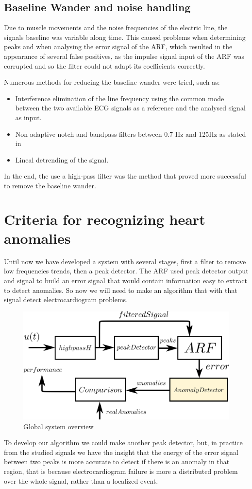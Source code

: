 \documentclass[conference]{IEEEtran}
\begin{document}
\subsection{Baseline Wander and noise handling}

Due to muscle movements and the noise frequencies of the electric line, the signals baseline was variable along time. This caused problems when determining peaks and when analysing the error signal of the ARF, which resulted in the appearance of several false positives, as the impulse signal input of the ARF was corrupted and so the filter could not adapt its coefficients correctly. \par
Numerous methods for reducing the baseline wander were tried, such as:
\begin{itemize}
\item Interference elimination of the line frequency using the common mode between the two available ECG signals as a reference and the analysed signal as input.
\item Non adaptive notch and bandpass filters between 0.7 Hz and 125Hz as stated in \cite{b2}
\item Lineal detrending of the signal.
\end{itemize}

In the end, the use a high-pass filter was the method that proved more successful to remove the baseline wander. 

\section{Criteria for recognizing heart anomalies}
Until now we have developed a system with several stages, first a filter to remove low frequencies trends, then a peak detector. The ARF used peak detector output and signal to build an error signal that would contain information easy to extract to detect anomalies.
So now we will need to make an algorithm that with that signal detect electrocardiogram problems.
\begin{figure}[H]
\centerline{\includegraphics[scale=0.55]{imagenes/diagram}}
\caption{Global system overview}
\label{fig}
\end{figure}
To develop our algorithm we could make another peak detector, but, in practice from the studied signals we have the insight that the energy of the error signal between two peaks is more accurate to detect if there is an anomaly in that region, that is because electrocardiogram failure is more a distributed problem over the whole signal, rather than a localized event.
\end{document}
